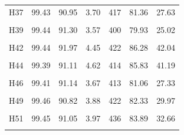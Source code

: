 \documentclass[
  a4paper,
  titlepage]{article}
\begin{document}
\begin{longtable}[t]{lllllll}
H37 & 99.43 & 90.95 & 3.70 & 417 & 81.36 & 27.63\\
 
\cellcolor{gray!6}{H38} & \cellcolor{gray!6}{99.35} & \cellcolor{gray!6}{90.38} & \cellcolor{gray!6}{4.49} & \cellcolor{gray!6}{426} & \cellcolor{gray!6}{85.41} & \cellcolor{gray!6}{38.95}\\
 
H39 & 99.44 & 91.30 & 3.57 & 400 & 79.93 & 25.02\\
 
\cellcolor{gray!6}{H41} & \cellcolor{gray!6}{99.49} & \cellcolor{gray!6}{90.85} & \cellcolor{gray!6}{5.17} & \cellcolor{gray!6}{443} & \cellcolor{gray!6}{88.01} & \cellcolor{gray!6}{48.36}\\
 
H42 & 99.44 & 91.97 & 4.45 & 422 & 86.28 & 42.04\\
 
\cellcolor{gray!6}{H43} & \cellcolor{gray!6}{99.41} & \cellcolor{gray!6}{90.70} & \cellcolor{gray!6}{3.78} & \cellcolor{gray!6}{422} & \cellcolor{gray!6}{81.90} & \cellcolor{gray!6}{28.51}\\
 
H44 & 99.39 & 91.11 & 4.62 & 414 & 85.83 & 41.19\\
 
\cellcolor{gray!6}{H45} & \cellcolor{gray!6}{99.44} & \cellcolor{gray!6}{90.60} & \cellcolor{gray!6}{4.16} & \cellcolor{gray!6}{422} & \cellcolor{gray!6}{83.88} & \cellcolor{gray!6}{33.60}\\
 
H46 & 99.41 & 91.14 & 3.67 & 413 & 81.06 & 27.33\\
 
\cellcolor{gray!6}{H47} & \cellcolor{gray!6}{99.40} & \cellcolor{gray!6}{91.80} & \cellcolor{gray!6}{4.06} & \cellcolor{gray!6}{415} & \cellcolor{gray!6}{84.18} & \cellcolor{gray!6}{34.99}\\
 
H49 & 99.46 & 90.82 & 3.88 & 422 & 82.33 & 29.97\\
 
\cellcolor{gray!6}{H50} & \cellcolor{gray!6}{99.40} & \cellcolor{gray!6}{90.71} & \cellcolor{gray!6}{4.05} & \cellcolor{gray!6}{435} & \cellcolor{gray!6}{83.94} & \cellcolor{gray!6}{33.68}\\
 
H51 & 99.45 & 91.05 & 3.97 & 436 & 83.89 & 32.66\\
 
\cellcolor{gray!6}{H52} & \cellcolor{gray!6}{99.48} & \cellcolor{gray!6}{92.79} & \cellcolor{gray!6}{4.26} & \cellcolor{gray!6}{333} & \cellcolor{gray!6}{86.53} & \cellcolor{gray!6}{40.39}\\
 

\end{longtable}
\end{document}
